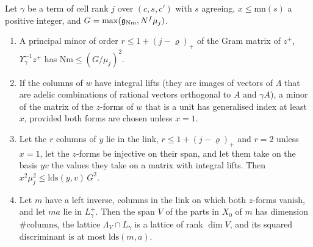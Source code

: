 \begin{lemma}\label{lem:cut}
Let $\gamma$ be a term of cell rank $j$ over $(c,s,c')$ with $s$ agreeing, $x\le\mathrm{mn}(s)$ a positive integer, and $G=\max(\mathfrak g_{\rm Nm},N^f\mu_j)$.
\begin{enumerate}[label=\textup{(\alph*)}]
\item A principal minor of order $r\le1+(j-\varrho)_+$ of the Gram matrix of $z^+$, $\Upsilon_\gamma^{-1}z^+$ has $\mathrm{Nm}\le(G/\mu_j)^2$.
\item If the columns of $w$ have integral lifts (they are images of vectors of $\Lambda$ that are adelic combinations of rational vectors orthogonal to $A$ and $\gamma A$), a minor of the matrix of the $z$-forms of $w$
that is a unit has generalised index at least $x$, provided both forms are chosen unless $x=1$.
\item Let the $r$ columns of $y$ lie in the link, $r\le1+(j-\varrho)_+$ and $r=2$ unless $x=1$, let the $z$-forms be injective on their span, and let them take on the basis $yv$ the values they take on a matrix with
integral lifts. Then $x^2\mu_j^2\le\mathrm{lds}(y,v)\,G^2$.
\item Let $m$ have a left inverse, columns in the link on which both $z$-forms vanish, and let $ma$ lie in $L^+_\gamma$. Then the span $V$ of the parts in $X_0$ of $m$ has dimension $\#\text{columns}$, the lattice
$\Lambda_V\cap L_\gamma$ is a lattice of rank $\dim V$, and its squared discriminant is at most $\mathrm{lds}(m,a)$.
\end{enumerate}
\end{lemma}

